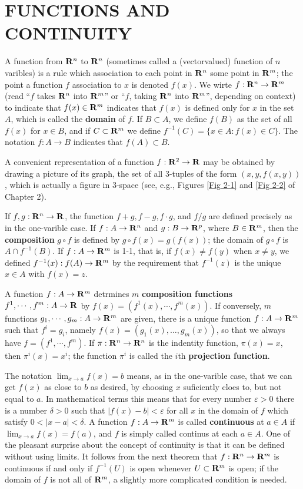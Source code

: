 \clearpage
\section{FUNCTIONS AND CONTINUITY}
A function from $\mathbf{R}^n$ to $\mathbf{R}^n$ (sometimes called a (vectorvalued) function of $n$ varibles)
is a rule which association to each point in $\mathbf{R}^n$ some point in $\mathbf{R}^m$;
the point a function $f$ association to $x$ is denoted $f(x)$.
We wirte $f:\mathbf{R}^n\to \mathbf{R}^m$ (read ``$f$ takes $\mathbf{R}^n$ into $\mathbf{R}^m$'' or ``$f$, taking
$\mathbf{R}^n$ into $\mathbf{R}^m$'', depending on context) to indicate that $f(x)\in \mathbf{R}^m$ 
indicates that $f(x)$ is defined only for $x$ in the set $A$, which is called the \textbf{domain}
of $f$. If $B\subset A$, we define $f(B)$ as the set of all $f(x)$ for $x\in B$, and if $C\subset \mathbf{R}^m$
we define $f^{-1}(C) = \{x\in A:f(x)\in C\}$. The notation $f:A\to B$ indicates that $f(A)\subset B$.

A convenient representation of a function $f: \mathbf{R}^2 \to \mathbf{R}$ may
be obtained by drawing a picture of its graph, the set of all
3-tuples of the form $(x,y,f(x,y))$, which is actually a figure in
3-space (see, e.g., Figures \ref{Fig 2-1} and \ref{Fig 2-2} of Chapter 2).

If $f, g:\mathbf{R}^n \to \mathbf{R}$, the function $f+g, f-g, f\cdot g$, and $f/g$ are defined 
precisely as in the one-varible case. If $f:A\to \mathbf{R}^n$ and $g:B\to \mathbf{R}^p$, where 
$B\in \mathbf{R}^m$, then the \textbf{composition} $g\circ f$ is defined by $g\circ f(x)=g(f(x))$;
the domain of $g\circ f$ is $A\cap f^{-1}(B)$. If $f:A\to \mathbf{R}^m$ is 1-1, that is, if 
$f(x)\neq f(y)$ when $x\neq y$, we defined $f^{-1}(x):f(A)\to \mathbf{R}^m$ by the requirement 
that $f^{-1}(z)$ is the unique $x\in A$ with $f(x) = z$.

A function $f:A\to \mathbf{R}^m$ detrmines $m$ \textbf{composition functions} $f^1, \cdots, f^m:A\to \mathbf{R}$
by $f(x) = \left(f^1(x), \cdots, f^m(x)\right)$. If conversely, $m$ functions $g_1, \cdots, g_m:A\to \mathbf{R}^m$
are given, there is a unique function $f:A\to \mathbf{R}^m$ such that $f^i = g_i$, 
namely $f(x) = \left(g_1(x), \dots, g_m(x)\right)$, so that we always have $f=\left(f^1, \cdots, f^m\right)$.
If $\pi: \mathbf{R}^n\to \mathbf{R}^n$ is the indentity function, $\pi(x) = x$, then $\pi^i(x) = x^i$; the function $\pi^i$
is called the $i$th \textbf{projection function}.

The notation $\lim_{x\to a}{f(x)} = b$ means, as in the one-varible case, that we can get $f(x)$ as close to $b$
as desired, by choosing $x$ suficiently cloes to, but not equal to $a$. In mathematical terms this means that 
for every number $\varepsilon >0$ there is a number $\delta >0$ such that $|f(x)-b|<\varepsilon$ for all $x$ in 
the domain of $f$ which satisfy $0<|x-a|<\delta$. A function $f:A\to \mathbf{R}^m$ is called \textbf{continuous} at 
$a\in A$ if $\lim_{x\to a }{f(x)} = f(a)$, and $f$ is simply called continus at each $a\in A$. One of the pleasant
surprise about the concept of continuity is that it can be defined without using limits. It follows from the 
next theorem that $f:\mathbf{R}^n\to \mathbf{R}^m$ is continuous if and only if $f^{-1}(U)$ is open whenever $U\subset \mathbf{R}^m$
is open; if the domain of $f$ is not all of $\mathbf{R}^m$, a slightly more complicated condition is needed.

